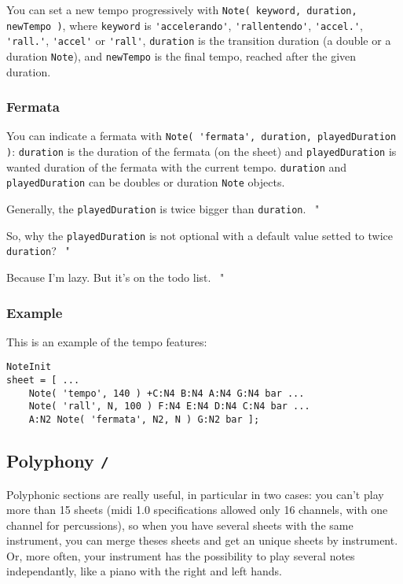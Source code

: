 \documentclass{article}
\newenvironment{meenv}{ \par \noindent \makebox[6em][r]{ \textcolor{mecolor}{Me}: " --~}}{~"}
\newenvironment{myselfenv}{ \par \noindent \makebox[6em][r]{ \textcolor{myselfcolor}{Myself}: " --~}}{~"}
\newcommand{ \me }[1]{%
\begin{meenv}%
	#1%
\end{meenv} }
\newcommand{ \myself }[1]{%
\begin{myselfenv}%
	#1%
\end{myselfenv} }
\begin{document}
You can set a new tempo progressively with \lstinline!Note( keyword, duration, newTempo )!, where \lstinline!keyword! is \lstinline!'accelerando'!, \lstinline!'rallentendo'!, \lstinline!'accel.'!, \lstinline!'rall.'!, \lstinline!'accel'! or \lstinline!'rall'!, \lstinline!duration! is the transition duration (a double or a duration \lstinline!Note!), and \lstinline!newTempo! is the final tempo, reached after the given duration.

\subsubsection{Fermata}
\label{sec:Fermata}

You can indicate a fermata with \lstinline!Note( 'fermata', duration, playedDuration )!: \lstinline!duration! is the duration of the fermata (on the sheet) and \lstinline!playedDuration! is wanted duration of the fermata with the current tempo. \lstinline!duration! and \lstinline!playedDuration! can be doubles or duration \lstinline!Note! objects.

\myself{Generally, the \lstinline!playedDuration! is twice bigger than \lstinline!duration!.}
\me{So, why the \lstinline!playedDuration! is not optional with a default value setted to twice \lstinline!duration!?}
\myself{Because I'm lazy. But it's on the todo list.}

\subsubsection{Example}

This is an example of the tempo features: \\

\begin{lstlisting}
NoteInit
sheet = [ ...
	Note( 'tempo', 140 ) +C:N4 B:N4 A:N4 G:N4 bar ...
	Note( 'rall', N, 100 ) F:N4 E:N4 D:N4 C:N4 bar ...
	A:N2 Note( 'fermata', N2, N ) G:N2 bar ];
\end{lstlisting}

\subsection{Polyphony \lstinline!/!}
\label{sec:Polyphony}

Polyphonic sections are really useful, in particular in two cases: you can't play more than 15 sheets (midi 1.0 specifications allowed only 16 channels, with one channel for percussions), so when you have several sheets with the same instrument, you can merge theses sheets and get an unique sheets by instrument. Or, more often, your instrument has the possibility to play several notes independantly, like a piano with the right and left hands.
\end{document}
